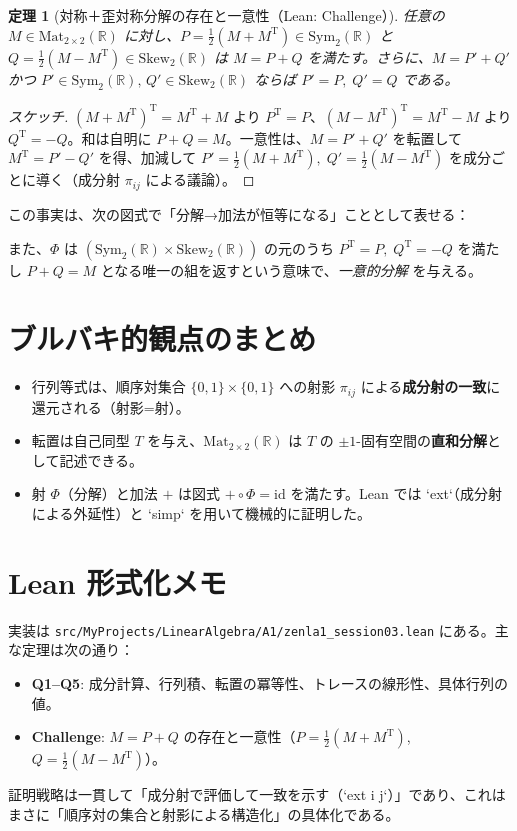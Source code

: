 \documentclass[luatexja,ja=standard,a4paper,12pt]{bxjsarticle}
\newcommand{\R}{\mathbb{R}}
\newcommand{\Mat}{\mathrm{Mat}}
\newcommand{\MatTwo}{\Mat_{2\times 2}(\R)}
\newcommand{\Sym}{\mathrm{Sym}_2(\R)}
\newcommand{\Skew}{\mathrm{Skew}_2(\R)}
\newcommand{\TT}{\mathrm{T}}
\theoremstyle{definition}
\theoremstyle{plain}
\newtheorem{theorem}{定理}
\theoremstyle{remark}
\begin{document}
\begin{theorem}[対称＋歪対称分解の存在と一意性（Lean: Challenge）]\label{thm:decomp}
任意の $M\in\MatTwo$ に対し、$P=\frac12(M+M^{\TT})\in\Sym$ と $Q=\frac12(M-M^{\TT})\in\Skew$ は $M=P+Q$ を満たす。さらに、$M=P'+Q'$ かつ $P'\in\Sym,\,Q'\in\Skew$ ならば $P'=P,\;Q'=Q$ である。
\end{theorem}

\begin{proof}[スケッチ]
$(M+M^{\TT})^{\TT}=M^{\TT}+M$ より $P^{\TT}=P$、$(M-M^{\TT})^{\TT}=M^{\TT}-M$ より $Q^{\TT}=-Q$。和は自明に $P+Q=M$。一意性は、$M=P'+Q'$ を転置して $M^{\TT}=P'-Q'$ を得、加減して $P'=\tfrac12(M+M^{\TT}),\;Q'=\tfrac12(M-M^{\TT})$ を成分ごとに導く（成分射 $\pi_{ij}$ による議論）。
\end{proof}

この事実は、次の図式で「分解→加法が恒等になる」こととして表せる：
\begin{center}
\end{center}

また、$\Phi$ は $(\Sym\times\Skew)$ の元のうち $P^{\TT}=P,\;Q^{\TT}=-Q$ を満たし $P+Q=M$ となる唯一の組を返すという意味で、\emph{一意的分解} を与える。

\section{ブルバキ的観点のまとめ}
\begin{itemize}
  \item 行列等式は、順序対集合 $\{0,1\}\times\{0,1\}$ への射影 $\pi_{ij}$ による\textbf{成分射の一致}に還元される（射影=射）。
  \item 転置は自己同型 $T$ を与え、$\MatTwo$ は $T$ の $\pm 1$-固有空間の\textbf{直和分解}として記述できる。
  \item 射 $\Phi$（分解）と加法 $+$ は図式 \emph{$+\circ\Phi=\mathrm{id}$} を満たす。Lean では `ext`（成分射による外延性）と `simp` を用いて機械的に証明した。
\end{itemize}

\section{Lean 形式化メモ}
実装は \texttt{src/MyProjects/LinearAlgebra/A1/zenla1\_session03.lean} にある。主な定理は次の通り：
\begin{itemize}
  \item \textbf{Q1–Q5}: 成分計算、行列積、転置の冪等性、トレースの線形性、具体行列の値。
  \item \textbf{Challenge}: $M=P+Q$ の存在と一意性（$P=\frac12(M+M^{\TT})$, $Q=\frac12(M-M^{\TT})$）。
\end{itemize}
証明戦略は一貫して「成分射で評価して一致を示す（`ext i j`）」であり、これはまさに「順序対の集合と射影による構造化」の具体化である。
\end{document}
